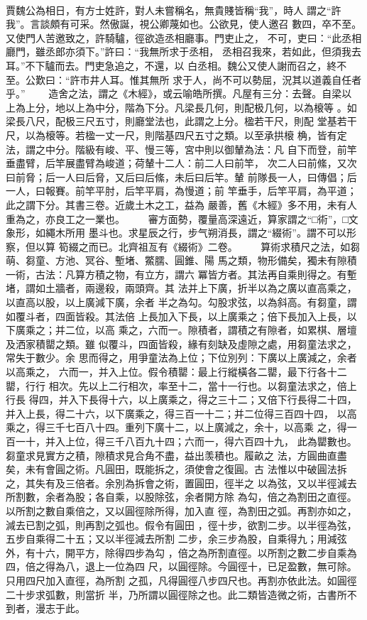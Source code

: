 \documentclass{ctexart}
\begin{document}
\paragraph{}
賈魏公為相日，有方士姓許，對人未嘗稱名，無貴賤皆稱``我''，時人 謂之``許我''。言談頗有可采。然傲誕，視公卿蔑如也。公欲見，使人邀召 數四，卒不至。又使門人苦邀致之，許騎驢，徑欲造丞相廳事。門吏止之， 不可，吏曰：``此丞相廳門，雖丞郎亦須下。''許曰：``我無所求于丞相， 丞相召我來，若如此，但須我去耳。''不下驢而去。門吏急追之，不還，以 白丞相。魏公又使人謝而召之，終不至。公歎曰：``許市井人耳。惟其無所 求于人，尚不可以勢屈，況其以道義自任者乎。'' 　　造舍之法，謂之《木經》，或云喻皓所撰。凡屋有三分：去聲。自梁以 上為上分，地以上為中分，階為下分。凡梁長几何，則配极几何，以為榱等 。如梁長八尺，配极三尺五寸，則廳堂法也，此謂之上分。楹若干尺，則配 堂基若干尺，以為榱等。若楹一丈一尺，則階基四尺五寸之類。以至承拱榱 桷，皆有定法，謂之中分。階級有峻、平、慢三等，宮中則以御輦為法：凡 自下而登，前竿垂盡臂，后竿展盡臂為峻道；荷輦十二人：前二人曰前竿， 次二人曰前絛，又次曰前脅；后一人曰后脅，又后曰后絛，未后曰后竿。輦 前隊長一人，曰傳倡；后一人，曰報賽。前竿平肘，后竿平肩，為慢道；前 竿垂手，后竿平肩，為平道；此之謂下分。其書三卷。近歲土木之工，益為 嚴善，舊《木經》多不用，未有人重為之，亦良工之一業也。 　　審方面勢，覆量高深遠近，算家謂之``□術''，□文象形，如繩木所用 墨斗也。求星辰之行，步气朔消長，謂之``綴術''。謂不可以形察，但以算 筍綴之而已。北齊祖亙有《綴術》二卷。 　　算術求積尺之法，如芻萌、芻童、方池、冥谷、塹堵、鱉臑、圓錐、陽 馬之類，物形備矣，獨未有隙積一術，古法：凡算方積之物，有立方，謂六 冪皆方者。其法再自乘則得之。有塹堵，謂如土牆者，兩邊殺，兩頭齊。其 法并上下廣，折半以為之廣以直高乘之，以直高以股，以上廣減下廣，余者 半之為勾。勾股求弦，以為斜高。有芻童，謂如覆斗者，四面皆殺。其法倍 上長加入下長，以上廣乘之；倍下長加入上長，以下廣乘之；并二位，以高 乘之，六而一。隙積者，謂積之有隙者，如累棋、層壇及洒家積罌之類。雖 似覆斗，四面皆殺，緣有刻缺及虛隙之處，用芻童法求之，常失于數少。余 思而得之，用爭童法為上位；下位別列：下廣以上廣減之，余者以高乘之， 六而一，并入上位。假令積罌：最上行縱橫各二罌，最下行各十二罌，行行 相次。先以上二行相次，率至十二，當十一行也。以芻童法求之，倍上行長 得四，并入下長得十六，以上廣乘之，得之三十二；又倍下行長得二十四， 并入上長，得二十六，以下廣乘之，得三百一十二；并二位得三百四十四， 以高乘之，得三千七百八十四。重列下廣十二，以上廣減之，余十，以高乘 之，得一百一十，并入上位，得三千八百九十四；六而一，得六百四十九， 此為罌數也。芻童求見實方之積，隙積求見合角不盡，益出羡積也。履畝之 法，方圓曲直盡矣，未有會圓之術。凡圓田，既能拆之，須使會之復圓。古 法惟以中破圓法拆之，其失有及三倍者。余別為拆會之術，置圓田，徑半之 以為弦，又以半徑減去所割數，余者為股；各自乘，以股除弦，余者開方除 為勾，倍之為割田之直徑。以所割之數自乘倍之，又以圓徑除所得，加入直 徑，為割田之弧。再割亦如之，減去已割之弧，則再割之弧也。假令有圓田 ，徑十步，欲割二步。以半徑為弦，五步自乘得二十五；又以半徑減去所割 二步，余三步為股，自乘得九；用減弦外，有十六，開平方，除得四步為勾 ，倍之為所割直徑。以所割之數二步自乘為四，倍之得為八，退上一位為四 尺，以圓徑除。今圓徑十，已足盈數，無可除。只用四尺加入直徑，為所割 之孤，凡得圓徑八步四尺也。再割亦依此法。如圓徑二十步求弧數，則當折 半，乃所謂以圓徑除之也。此二類皆造微之術，古書所不到者，漫志于此。 
\end{document}

